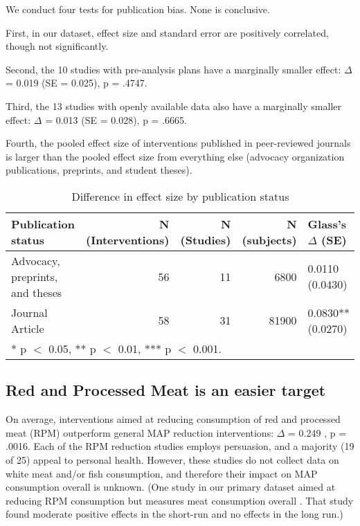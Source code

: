 \documentclass[sn-nature,pdflatex]{sn-jnl}
\begin{document}
We conduct four tests for publication bias. None is conclusive.

\begin{comment} 
Could put in introductory remarks about how this puts our main results in one light or another? 
\end{comment}

First, in our dataset, effect size and standard error are positively
correlated, though not significantly.

Second, the 10 studies with pre-analysis plans have a marginally smaller
effect: \(\Delta\) = 0.019 (SE = 0.025), p = .4747.

Third, the 13 studies with openly available data also have a marginally
smaller effect: \(\Delta\) = 0.013 (SE = 0.028), p = .6665.

Fourth, the pooled effect size of interventions published in
peer-reviewed journals is larger than the pooled effect size from
everything else (advocacy organization publications, preprints, and
student theses).

\begin{table}[!h]
\centering
\caption{\label{tab:table_three}Difference in effect size by publication status}
\centering
\begin{tabular}[t]{lrrrl}
\toprule
Publication status & N (Interventions) & N (Studies) & N (subjects) & Glass's $\Delta$ (SE)\\
\midrule
Advocacy, preprints, and theses & 56 & 11 & 6800 & 0.0110 (0.0430)\\
Journal Article & 58 & 31 & 81900 & 0.0830** (0.0270)\\
\bottomrule
\multicolumn{5}{l}{\rule{0pt}{1em}* p $<$ 0.05, ** p $<$ 0.01, *** p $<$ 0.001.}\\
\end{tabular}
\end{table}

\subsection{Red and Processed Meat is an easier target}\label{sec2.3}

On average, interventions aimed at reducing consumption of red and
processed meat (RPM) outperform general MAP reduction interventions:
\(\Delta\) = 0.249 , p = .0016. Each of the RPM
reduction studies employs persuasion, and a majority (19 of 25) appeal
to personal health. However, these studies do not collect data on white
meat and/or fish consumption, and therefore their impact on MAP
consumption overall is unknown. (One study in our primary dataset aimed
at reducing RPM consumption but measures meat consumption overall
\citep{shreedhar2021}. That study found moderate positive effects in the
short-run and no effects in the long run.)
\end{document}
